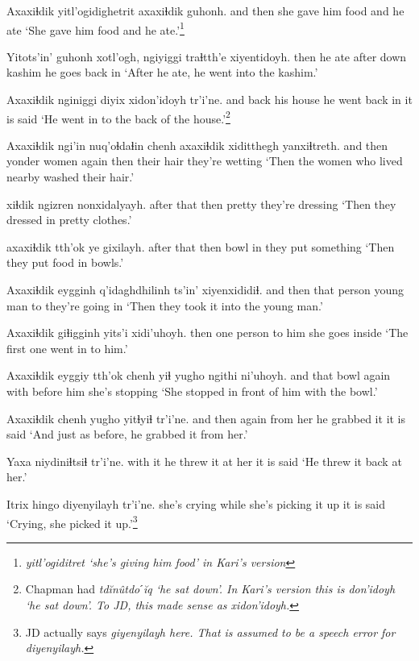 \documentclass[12pt]{article}
\begin{document}
\gll Axaxiɬdik yitl'ogidighetrit axaxiɬdik guhonh.
{and then} {she gave him food} and {he ate}
\glt `She gave him food and he ate.'\footnote{\em yitl'ogiditret \em `she's giving him food' in Kari's version}
\glend

\gll Yitots'in' guhonh xotl'ogh, ngiyiggi traɬtth'e xiyentidoyh.
then {he ate} after  down  kashim  {he goes back in}
\glt `After he ate, he went into the kashim.'
\glend

\gll Axaxiɬdik nginiggi diyix  xidon'idoyh tr'i'ne.
and  back  {his house} {he went back in} {it is said}
\glt `He went in to the back of the house.'\footnote{Chapman had \em td\u{i}n\^utdoˊ\u{i}q \em `he sat down'. In Kari's version this is \em don'idoyh \em `he sat down'. To JD, this made sense as \em xidon'idoyh.}
\glend

\gll Axaxiɬdik ngi'in nuq'oɬdaɬin chenh axaxiɬdik xiditthegh yanxiɬtreth.
{and then} yonder women again then {their hair} {they're wetting}
\glt `Then the women who lived nearby washed their hair.'
\glend

 xiɬdik  ngizren nonxidalyayh.
{after that} then  pretty {they're dressing}
\glt `Then they dressed in pretty clothes.'
\glend

 axaxiɬdik tth'ok  ye gixilayh.
{after that}  then  bowl in {they put something}
\glt `Then they put food in bowls.'
\glend

\gll Axaxiɬdik eygginh q'idaghdhilinh ts'in' xiyenxididiɬ.
{and then} {that person} {young man} to {they're going in}
\glt `Then they took it into the young man.'
\glend

\gll Axaxiɬdik giɬigginh yits'i xidi'uhoyh.
then  {one person} {to him} {she goes inside}
\glt `The first one went in to him.'
\glend

\gll Axaxiɬdik eyggiy  tth'ok  chenh yiɬ {yugho ngithi}  ni'uhoyh.
and  that  bowl again with {before him}  {she's stopping}
\glt `She stopped in front of him with the bowl.'
\glend

\gll Axaxiɬdik chenh yugho yitɬyiɬ tr'i'ne.
{and then} again {from her} {he grabbed it} {it is said}
\glt `And just as before, he grabbed it from her.'
\glend

\gll Yaxa niydiniɬtsiɬ  tr'i'ne.
{with it} {he threw it at her} {it is said}
\glt `He threw it back at her.'
\glend

\gll Itrix  hingo diyenyilayh  tr'i'ne.
{she's crying} while {she's picking it up} {it is said}
\glt `Crying, she picked it up.'\footnote{JD actually says \em giyenyilayh \em here. That is assumed to be a speech error for \em diyenyilayh.}
\glend
\end{document}
